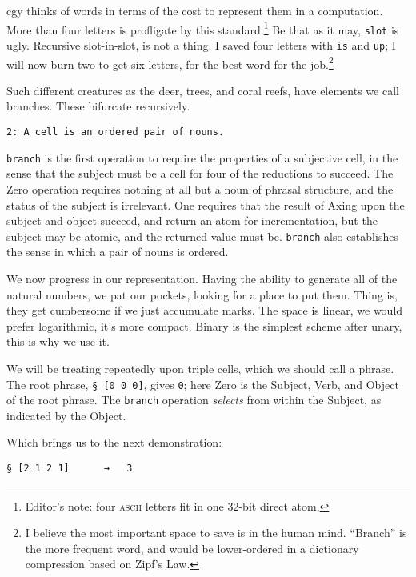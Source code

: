 \documentclass[twoside]{article}
\begin{document}
cgy thinks of words in terms of the cost to represent them in a computation. More than four letters is profligate by this standard.\footnote{Editor's note:  four \textsc{ascii} letters fit in one 32-bit direct atom.} Be that as it may, \texttt{slot} is ugly. Recursive slot-in-slot, is not a thing. I saved four letters with \texttt{is} and \texttt{up}; I will now burn two to get six letters, for the best word for the job.\footnote{I believe the most important space to save is in the human mind. ``Branch'' is the more frequent word, and would be lower-ordered in a dictionary compression based on Zipf's Law.}

Such different creatures as the deer, trees, and coral reefs, have elements we call branches. These bifurcate recursively.

\begin{lstlisting}[style=listingblock]
2: A cell is an ordered pair of nouns.
\end{lstlisting}

\noindent
\texttt{branch} is the first operation to require the properties of a subjective cell, in the sense that the subject must be a cell for four of the reductions to succeed. The Zero operation requires nothing at all but a noun of phrasal structure, and the status of the subject is irrelevant. One requires that the result of Axing upon the subject and object succeed, and return an atom for incrementation, but the subject may be atomic, and the returned value must be.  \texttt{branch} also establishes the sense in which a pair of nouns is ordered.

We now progress in our representation. Having the ability to generate all of the natural numbers, we pat our pockets, looking for a place to put them. Thing is, they get cumbersome if we just accumulate marks. The space is linear, we would prefer logarithmic, it's more compact. Binary is the simplest scheme after unary, this is why we use it.

We will be treating repeatedly upon triple cells, which we should call a phrase. The root phrase, \lstinline[style=inlinecode]{§ [0 0 0]}, gives \texttt{0}; here Zero is the Subject, Verb, and Object of the root phrase. The \texttt{branch} operation \emph{selects} from within the Subject, as indicated by the Object.

Which brings us to the next demonstration:

\begin{lstlisting}[style=listingcode]
§ [2 1 2 1]      →   3
\end{lstlisting}
\end{document}
